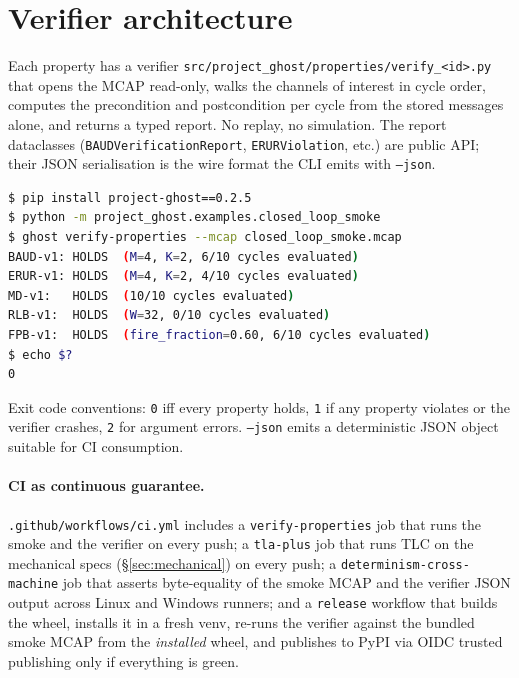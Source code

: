 \documentclass[11pt,a4paper]{article}
\begin{document}
\section{Verifier architecture}
\label{sec:verifier}

Each property has a verifier
\texttt{src/project\_ghost/properties/verify\_<id>.py} that opens the
MCAP read-only, walks the channels of interest in cycle order,
computes the precondition and postcondition per cycle from the
stored messages alone, and returns a typed report. No replay, no
simulation. The report dataclasses
(\texttt{BAUDVerificationReport}, \texttt{ERURViolation}, etc.) are
public API; their JSON serialisation is the wire format the CLI
emits with \texttt{--json}.

\begin{lstlisting}[language=bash]
$ pip install project-ghost==0.2.5
$ python -m project_ghost.examples.closed_loop_smoke
$ ghost verify-properties --mcap closed_loop_smoke.mcap
BAUD-v1: HOLDS  (M=4, K=2, 6/10 cycles evaluated)
ERUR-v1: HOLDS  (M=4, K=2, 4/10 cycles evaluated)
MD-v1:   HOLDS  (10/10 cycles evaluated)
RLB-v1:  HOLDS  (W=32, 0/10 cycles evaluated)
FPB-v1:  HOLDS  (fire_fraction=0.60, 6/10 cycles evaluated)
$ echo $?
0
\end{lstlisting}

Exit code conventions: \texttt{0} iff every property holds, \texttt{1}
if any property violates or the verifier crashes, \texttt{2} for
argument errors. \texttt{--json} emits a deterministic JSON object
suitable for CI consumption.

\paragraph{CI as continuous guarantee.}
\texttt{.github/workflows/ci.yml} includes a
\texttt{verify-properties} job that runs the smoke and the verifier
on every push; a \texttt{tla-plus} job that runs TLC on the
mechanical specs (\S\ref{sec:mechanical}) on every push; a
\texttt{determinism-cross-machine} job that asserts byte-equality of
the smoke MCAP and the verifier JSON output across Linux and Windows
runners; and a \texttt{release} workflow that builds the wheel,
installs it in a fresh venv, re-runs the verifier against the
bundled smoke MCAP from the \emph{installed} wheel, and publishes
to PyPI via OIDC trusted publishing only if everything is green.

\end{document}
